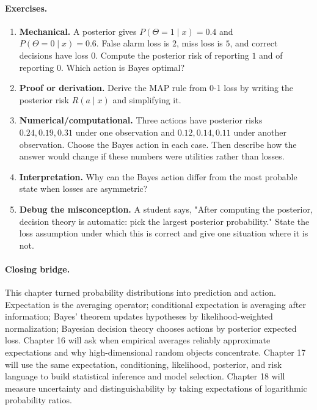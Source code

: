 \paragraph{Exercises.}
\begin{enumerate}[label=\textbf{15.4.\arabic*.}, leftmargin=*]
\item \textbf{Mechanical.} A posterior gives \(P(\Theta=1\mid x)=0.4\) and \(P(\Theta=0\mid x)=0.6\). False alarm loss is \(2\), miss loss is \(5\), and correct decisions have loss \(0\). Compute the posterior risk of reporting \(1\) and of reporting \(0\). Which action is Bayes optimal?
\item \textbf{Proof or derivation.} Derive the MAP rule from 0-1 loss by writing the posterior risk \(R(a\mid x)\) and simplifying it.
\item \textbf{Numerical/computational.} Three actions have posterior risks \(0.24,0.19,0.31\) under one observation and \(0.12,0.14,0.11\) under another observation. Choose the Bayes action in each case. Then describe how the answer would change if these numbers were utilities rather than losses.
\item \textbf{Interpretation.} Why can the Bayes action differ from the most probable state when losses are asymmetric?
\item \textbf{Debug the misconception.} A student says, "After computing the posterior, decision theory is automatic: pick the largest posterior probability." State the loss assumption under which this is correct and give one situation where it is not.
\end{enumerate}

\paragraph{Closing bridge.}
This chapter turned probability distributions into prediction and action. Expectation is the averaging operator; conditional expectation is averaging after information; Bayes' theorem updates hypotheses by likelihood-weighted normalization; Bayesian decision theory chooses actions by posterior expected loss. Chapter 16 will ask when empirical averages reliably approximate expectations and why high-dimensional random objects concentrate. Chapter 17 will use the same expectation, conditioning, likelihood, posterior, and risk language to build statistical inference and model selection. Chapter 18 will measure uncertainty and distinguishability by taking expectations of logarithmic probability ratios.

\clearpage
